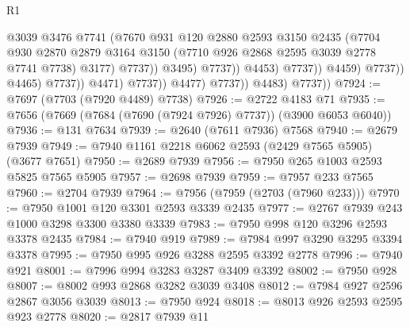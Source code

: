 \begin{lexlean}{R1}
\begin{coremodule}
                                                @3039
                                                @3476
                                                @7741
                                                (@7670
                                                  @931
                                                  @120
                                                  @2880
                                                  @2593
                                                  @3150
                                                  @2435
                                                  (@7704
                                                    @930
                                                    @2870
                                                    @2879
                                                    @3164
                                                    @3150
                                                    (@7710 @926 @2868 @2595 @3039 @2778 @7741 @7738)
                                                    @3177)
                                                  @7737))
                                              @3495)
                                            @7737))
                                        @4453)
                                      @7737))
                                  @4459)
                                @7737))
                            @4465)
                          @7737))
                      @4471)
                    @7737))
                @4477)
              @7737))
          @4483)
        @7737))
@7924 := @7697 (@7703 (@7920 @4489) @7738)
@7926 := @2722 @4183 @71
@7935 := @7656 (@7669 (@7684 (@7690 (@7924 @7926) @7737)) (@3900 @6053 @6040))
@7936 := @131 @7634
@7939 := @2640 (@7611 @7936) @7568
@7940 := @2679 @7939
@7949 := @7940 @1161 @2218 @6062 @2593 (@2429 @7565 @5905) (@3677 @7651)
@7950 := @2689 @7939
@7956 := @7950 @265 @1003 @2593 @5825 @7565 @5905
@7957 := @2698 @7939
@7959 := @7957 @233 @7565
@7960 := @2704 @7939
@7964 := @7956 (@7959 (@2703 (@7960 @233)))
@7970 := @7950 @1001 @120 @3301 @2593 @3339 @2435
@7977 := @2767 @7939 @243 @1000 @3298 @3300 @3380 @3339
@7983 := @7950 @998 @120 @3296 @2593 @3378 @2435
@7984 := @7940 @919
@7989 := @7984 @997 @3290 @3295 @3394 @3378
@7995 := @7950 @995 @926 @3288 @2595 @3392 @2778
@7996 := @7940 @921
@8001 := @7996 @994 @3283 @3287 @3409 @3392
@8002 := @7950 @928
@8007 := @8002 @993 @2868 @3282 @3039 @3408
@8012 := @7984 @927 @2596 @2867 @3056 @3039
@8013 := @7950 @924
@8018 := @8013 @926 @2593 @2595 @923 @2778
@8020 := @2817 @7939 @11

\end{coremodule}
\end{lexlean}

